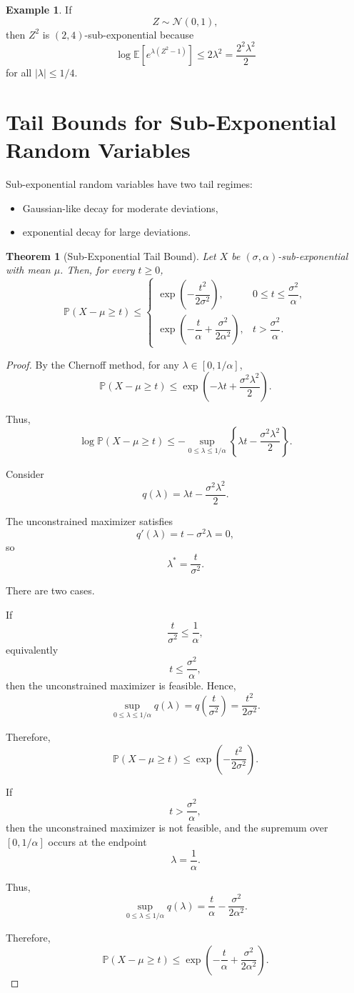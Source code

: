 \documentclass[12pt,oneside]{book}
\numberwithin{equation}{section}
\theoremstyle{definition}
\newtheorem{example}{Example}[section]
\theoremstyle{plain}
\newtheorem{theorem}{Theorem}[section]
\theoremstyle{remark}
\newcommand{\E}{\mathbb{E}}
\newcommand{\Prob}{\mathbb{P}}
\newcommand{\Normal}{\mathcal{N}}
\begin{document}
\begin{example}
If
\[
Z\sim \Normal(0,1),
\]
then $Z^2$ is $(2,4)$-sub-exponential because
\[
\log\E\left[e^{\lambda(Z^2-1)}\right]
\leq
2\lambda^2
=
\frac{2^2\lambda^2}{2}
\]
for all $|\lambda|\leq 1/4$.
\end{example}

\section{Tail Bounds for Sub-Exponential Random Variables}

Sub-exponential random variables have two tail regimes:
\begin{itemize}
\item Gaussian-like decay for moderate deviations,
\item exponential decay for large deviations.
\end{itemize}

\begin{theorem}[Sub-Exponential Tail Bound]
Let $X$ be $(\sigma,\alpha)$-sub-exponential with mean $\mu$. Then, for every $t\geq0$,
\[
\Prob(X-\mu\geq t)
\leq
\begin{cases}
\exp\left(-\dfrac{t^2}{2\sigma^2}\right),
&
0\leq t\leq \dfrac{\sigma^2}{\alpha},
\\[1.25em]
\exp\left(-\dfrac{t}{\alpha}+\dfrac{\sigma^2}{2\alpha^2}\right),
&
t> \dfrac{\sigma^2}{\alpha}.
\end{cases}
\]
\end{theorem}

\begin{proof}
By the Chernoff method, for any $\lambda\in[0,1/\alpha]$,
\[
\Prob(X-\mu\geq t)
\leq
\exp\left(
-\lambda t+\frac{\sigma^2\lambda^2}{2}
\right).
\]

Thus,
\[
\log\Prob(X-\mu\geq t)
\leq
-\sup_{0\leq \lambda\leq 1/\alpha}
\left\{
\lambda t-\frac{\sigma^2\lambda^2}{2}
\right\}.
\]

Consider
\[
q(\lambda)
=
\lambda t-\frac{\sigma^2\lambda^2}{2}.
\]

The unconstrained maximizer satisfies
\[
q'(\lambda)=t-\sigma^2\lambda=0,
\]
so
\[
\lambda^*=\frac{t}{\sigma^2}.
\]

There are two cases.

If
\[
\frac{t}{\sigma^2}\leq \frac{1}{\alpha},
\]
equivalently
\[
t\leq \frac{\sigma^2}{\alpha},
\]
then the unconstrained maximizer is feasible. Hence,
\[
\sup_{0\leq \lambda\leq 1/\alpha}
q(\lambda)
=
q\left(\frac{t}{\sigma^2}\right)
=
\frac{t^2}{2\sigma^2}.
\]

Therefore,
\[
\Prob(X-\mu\geq t)
\leq
\exp\left(
-\frac{t^2}{2\sigma^2}
\right).
\]

If
\[
t> \frac{\sigma^2}{\alpha},
\]
then the unconstrained maximizer is not feasible, and the supremum over $[0,1/\alpha]$ occurs at the endpoint
\[
\lambda=\frac{1}{\alpha}.
\]

Thus,
\[
\sup_{0\leq \lambda\leq 1/\alpha}
q(\lambda)
=
\frac{t}{\alpha}
-
\frac{\sigma^2}{2\alpha^2}.
\]

Therefore,
\[
\Prob(X-\mu\geq t)
\leq
\exp\left(
-\frac{t}{\alpha}
+
\frac{\sigma^2}{2\alpha^2}
\right).
\]
\end{proof}
\end{document}

